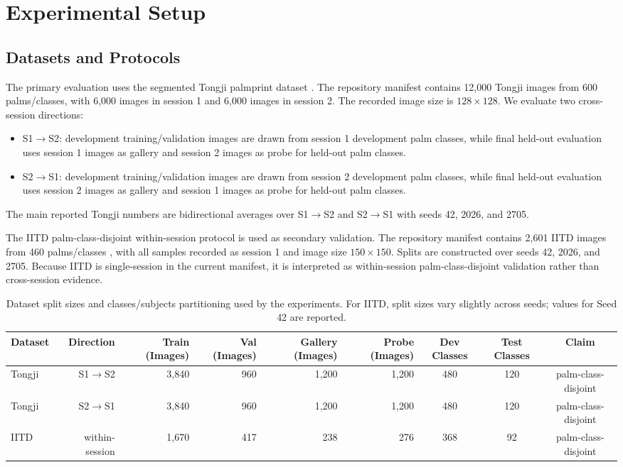 \section{Experimental Setup}

\subsection{Datasets and Protocols}

The primary evaluation uses the segmented Tongji palmprint dataset \cite{zhang2017tongji}. The repository manifest contains 12,000 Tongji images from 600 palms/classes, with 6,000 images in session 1 and 6,000 images in session 2. The recorded image size is $128 \times 128$. We evaluate two cross-session directions:
\begin{itemize}
    \item S1$\rightarrow$S2: development training/validation images are drawn from session 1 development palm classes, while final held-out evaluation uses session 1 images as gallery and session 2 images as probe for held-out palm classes.
    \item S2$\rightarrow$S1: development training/validation images are drawn from session 2 development palm classes, while final held-out evaluation uses session 2 images as gallery and session 1 images as probe for held-out palm classes.
\end{itemize}
The main reported Tongji numbers are bidirectional averages over S1$\rightarrow$S2 and S2$\rightarrow$S1 with seeds 42, 2026, and 2705.

The IITD palm-class-disjoint within-session protocol is used as secondary validation. The repository manifest contains 2,601 IITD images from 460 palms/classes \cite{iitd_touchless_palmprint}, with all samples recorded as session 1 and image size $150 \times 150$. Splits are constructed over seeds 42, 2026, and 2705. Because IITD is single-session in the current manifest, it is interpreted as within-session palm-class-disjoint validation rather than cross-session evidence.

\begin{table}[t]
\centering
\scriptsize
\setlength{\tabcolsep}{4pt}
\caption{Dataset split sizes and classes/subjects partitioning used by the experiments. For IITD, split sizes vary slightly across seeds; values for Seed 42 are reported.}
\label{tab:split_sizes}
\begin{tabular}{lrrrrrccc}
\hline
Dataset & Direction & Train (Images) & Val (Images) & Gallery (Images) & Probe (Images) & Dev Classes & Test Classes & Claim \\
\hline
Tongji & S1$\rightarrow$S2 & 3,840 & 960 & 1,200 & 1,200 & 480 & 120 & palm-class-disjoint \\
Tongji & S2$\rightarrow$S1 & 3,840 & 960 & 1,200 & 1,200 & 480 & 120 & palm-class-disjoint \\
IITD & within-session & 1,670 & 417 & 238 & 276 & 368 & 92 & palm-class-disjoint \\
\hline
\end{tabular}
\end{table}

